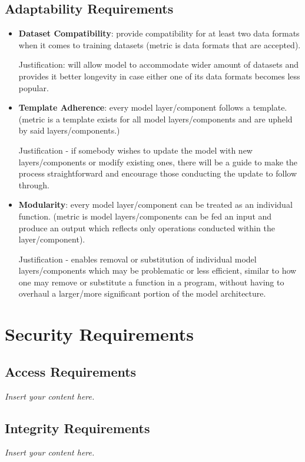 \documentclass[12pt]{article}
\newcommand{\lips}{\textit{Insert your content here.}}
\begin{document}
\subsection{Adaptability Requirements}
\begin{itemize}
    \item \textbf{Dataset Compatibility}: provide compatibility for at least 
    two data formats when it comes to training datasets (metric is data 
    formats that are accepted).

    Justification: will allow model to accommodate wider amount of datasets 
    and provides it better longevity in case either one of its data formats 
    becomes less popular.
    
    \item \textbf{Template Adherence}:  every model layer/component follows a 
    template. (metric is a template exists for all model layers/components and
     are upheld by said layers/components.)

    Justification - if somebody wishes to update the model with new 
    layers/components or modify existing ones, there will be a guide to make 
    the process straightforward and encourage those conducting the update to 
    follow through.

    \item \textbf{Modularity}:  every model layer/component can be treated as 
    an individual function. (metric is model layers/components can be fed an 
    input and produce an output which reflects only operations conducted within
     the layer/component).

    Justification - enables removal or substitution of individual model 
    layers/components which may be problematic or less efficient, similar to 
    how one may remove or substitute a function in a program, without having to
     overhaul a larger/more significant portion of the model architecture.


\end{itemize}

\section{Security Requirements}
\subsection{Access Requirements}
\lips
\subsection{Integrity Requirements}
\lips
\end{document}
